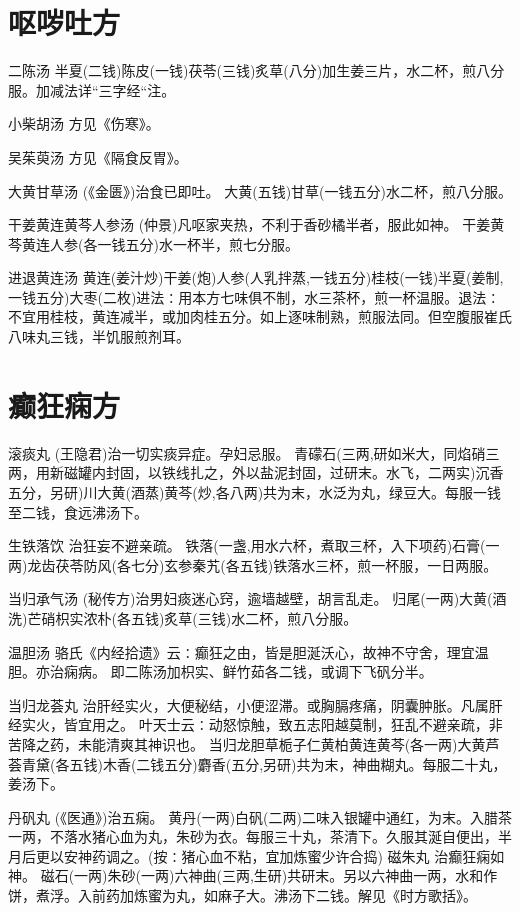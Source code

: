 \documentclass[a4paper,12pt,UTF8,twoside]{ctexbook}
\begin{document}
	

	\section{呕哕吐方}
	
	
	二陈汤
	半夏(二钱)陈皮(一钱)茯苓(三钱)炙草(八分)加生姜三片，水二杯，煎八分服。加减法详“三字经“注。
	
	小柴胡汤
	方见《伤寒》。
	
	吴茱萸汤
	方见《隔食反胃》。
	
	大黄甘草汤
	(《金匮》)治食已即吐。
	大黄(五钱)甘草(一钱五分)水二杯，煎八分服。
	
	干姜黄连黄芩人参汤
	(仲景)凡呕家夹热，不利于香砂橘半者，服此如神。
	干姜黄芩黄连人参(各一钱五分)水一杯半，煎七分服。
	
	进退黄连汤
	黄连(姜汁炒)干姜(炮)人参(人乳拌蒸,一钱五分)桂枝(一钱)半夏(姜制,一钱五分)大枣(二枚)进法∶用本方七味俱不制，水三茶杯，煎一杯温服。退法∶不宜用桂枝，黄连减半，或加肉桂五分。如上逐味制熟，煎服法同。但空腹服崔氏八味丸三钱，半饥服煎剂耳。
	
	
	
	
	\section{癫狂痫方}
	
	
	滚痰丸
	(王隐君)治一切实痰异症。孕妇忌服。
	青礞石(三两,研如米大，同焰硝三两，用新磁罐内封固，以铁线扎之，外以盐泥封固，过研末。水飞，二两实)沉香五分，另研)川大黄(酒蒸)黄芩(炒,各八两)共为末，水泛为丸，绿豆大。每服一钱至二钱，食远沸汤下。
	
	生铁落饮
	治狂妄不避亲疏。
	铁落(一盏,用水六杯，煮取三杯，入下项药)石膏(一两)龙齿茯苓防风(各七分)玄参秦艽(各五钱)铁落水三杯，煎一杯服，一日两服。
	
	当归承气汤
	(秘传方)治男妇痰迷心窍，逾墙越壁，胡言乱走。
	归尾(一两)大黄(酒洗)芒硝枳实浓朴(各五钱)炙草(三钱)水二杯，煎八分服。
	
	温胆汤
	骆氏《内经拾遗》云∶癫狂之由，皆是胆涎沃心，故神不守舍，理宜温胆。亦治痫病。
	即二陈汤加枳实、鲜竹茹各二钱，或调下飞矾分半。
	
	当归龙荟丸
	治肝经实火，大便秘结，小便涩滞。或胸膈疼痛，阴囊肿胀。凡属肝经实火，皆宜用之。
	叶天士云∶动怒惊触，致五志阳越莫制，狂乱不避亲疏，非苦降之药，未能清爽其神识也。
	当归龙胆草栀子仁黄柏黄连黄芩(各一两)大黄芦荟青黛(各五钱)木香(二钱五分)麝香(五分,另研)共为末，神曲糊丸。每服二十丸，姜汤下。
	
	丹矾丸
	(《医通》)治五痫。
	黄丹(一两)白矾(二两)二味入银罐中通红，为末。入腊茶一两，不落水猪心血为丸，朱砂为衣。每服三十丸，茶清下。久服其涎自便出，半月后更以安神药调之。(按∶猪心血不粘，宜加炼蜜少许合捣)
	磁朱丸
	治癫狂痫如神。
	磁石(一两)朱砂(一两)六神曲(三两,生研)共研末。另以六神曲一两，水和作饼，煮浮。入前药加炼蜜为丸，如麻子大。沸汤下二钱。解见《时方歌括》。
	
\end{document}
